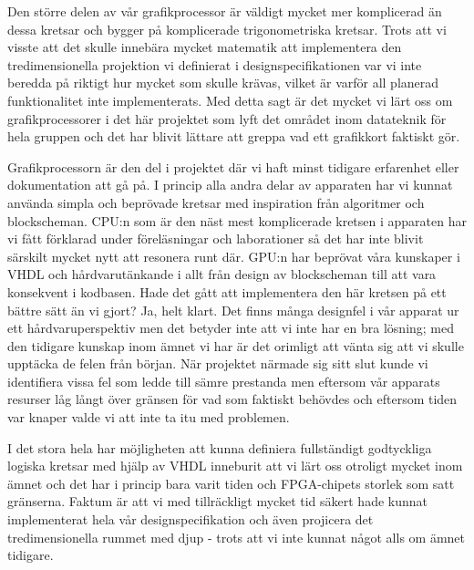 \documentclass[a4paper]{article}
\begin{document}
        Den större
        delen av vår grafikprocessor är väldigt mycket mer komplicerad än dessa kretsar och bygger
        på komplicerade trigonometriska kretsar. Trots att vi visste att det skulle innebära mycket
        matematik att implementera den tredimensionella projektion vi definierat i 
        designspecifikationen var vi inte beredda på riktigt hur mycket som skulle krävas, vilket är
        varför all planerad funktionalitet inte implementerats. Med detta sagt är det mycket vi
        lärt oss om grafikprocessorer i det här projektet som lyft det området inom datateknik för
        hela gruppen och det har blivit lättare att greppa vad ett grafikkort faktiskt gör.

        Grafikprocessorn är den del i projektet där vi haft minst tidigare erfarenhet eller
        dokumentation att gå på. I princip alla andra delar av apparaten har vi kunnat använda
        simpla och beprövade kretsar med inspiration från algoritmer och blockscheman. CPU:n som är
        den näst mest komplicerade kretsen i apparaten har vi fått förklarad under föreläsningar och
        laborationer så det har inte blivit särskilt mycket nytt att resonera runt där. GPU:n har
        beprövat våra kunskaper i VHDL och hårdvarutänkande i allt från design av blockscheman till
        att vara konsekvent i kodbasen. Hade det gått att implementera den här kretsen på ett bättre
        sätt än vi gjort? Ja, helt klart. Det finns många designfel i vår apparat ur ett
        hårdvaruperspektiv men det betyder inte att vi inte har en bra lösning; med den tidigare
        kunskap inom ämnet vi har är det orimligt att vänta sig att vi skulle upptäcka de felen från
        början. När projektet närmade sig sitt slut kunde vi identifiera vissa fel som ledde till
        sämre prestanda men eftersom vår apparats resurser låg långt över gränsen för vad som
        faktiskt behövdes och eftersom tiden var knaper valde vi att inte ta itu med problemen.

        I det stora hela har möjligheten att kunna definiera fullständigt godtyckliga logiska 
        kretsar med hjälp av VHDL inneburit att vi lärt oss otroligt mycket inom ämnet och det har
        i princip bara varit tiden och FPGA-chipets storlek som satt gränserna. Faktum är att vi
        med tillräckligt mycket tid säkert hade kunnat implementerat hela vår designspecifikation
        och även projicera det tredimensionella rummet med djup - trots att vi inte kunnat något
        alls om ämnet tidigare.
\end{document}
